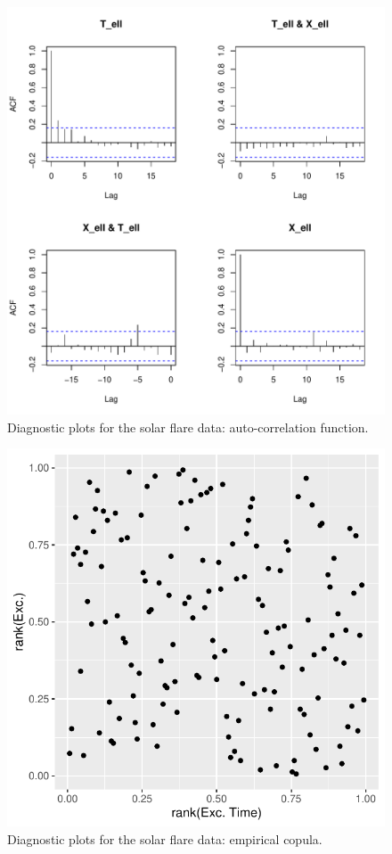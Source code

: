 \documentclass[]{elsarticle} %
\begin{document}
\begin{figure}
\includegraphics[width=\textwidth]{article_springer_files/figure-latex/flare-diagnostics-1-1} \caption{\label{fig:flare-diagnostics-1} Diagnostic plots for the solar flare data: auto-correlation function.}\label{fig:flare-diagnostics-1}
\end{figure}

\begin{figure}

{\centering \includegraphics[width=0.7\linewidth]{article_springer_files/figure-latex/flare-diagnostics-2-1} 

}

\caption{\label{fig:flare-diagnostics-2} Diagnostic plots for the solar flare data: empirical copula.}\label{fig:flare-diagnostics-2}
\end{figure}
\end{document}
